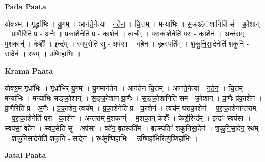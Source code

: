 \documentclass[17pt]{extarticle}
\begin{document}
\textbf{Pada Paata} \newline

योक्त्र᳚म् । गृद्ध्रा॑भिः । यु॒गम् । आन॑ते॒नेत्या - न॒ते॒न॒ । चि॒त्तम् । मन्या॑भिः । स॒क्र्ॐ॒शानिति॑ सं - क्रो॒शान् । प्रा॒णैरिति॑ प्र - अ॒नैः । प्र॒का॒शेनेति॑ प्र - का॒शेन॑ । त्वच᳚म् । प॒रा॒का॒शेनेति॑ परा - का॒शेन॑ । अन्त॑राम् । म॒शकान्॑ । केशैः᳚ । इन्द्र᳚म् । स्वप॒सेति॑ सु - अप॑सा । वहे॑न । बृह॒स्पति᳚म् । श॒कु॒नि॒सा॒देनेति॑ शकुनि - सा॒देन॑ । रथ᳚म् । उ॒ष्णिहा॑भिः ॥  \newline


\textbf{Krama Paata} \newline

योक्त्र॒म् गृध्रा॑भिः । गृध्रा॑भिर् यु॒गम् । यु॒गमान॑तेन । आन॑तेन चि॒त्तम् । आन॑ते॒नेत्या - न॒ते॒न॒ । चि॒त्तम् मन्या॑भिः । मन्या॑भिः सङ्क्रो॒शान् । स॒ङ्क्रो॒शान् प्रा॒णैः । स॒ङ्क्रो॒शानिति॑ सम् - क्रो॒शान् । प्रा॒णैः प्र॑का॒शेन॑ । प्रा॒णैरिति॑ प्र - अ॒नैः । प्र॒का॒शेन॒ त्वच᳚म् । प्र॒का॒शेनेति॑ प्र - का॒शेन॑ । त्वच॑म् पराका॒शेन॑ । प॒रा॒का॒शेनान्त॑राम् । प॒रा॒का॒शेनेति॑ परा -  का॒शेन॑ । अन्त॑राम् म॒शकान्॑ । म॒शका॒न् केशैः᳚ । केशै॒रिन्द्र᳚म् । इन्द्रꣳ॒॒ स्वप॑सा । स्वप॑सा॒ वहे॑न । स्वप॒सेति॑ सु - अप॑सा । वहे॑न॒ बृह॒स्पति᳚म् । बृह॒स्पतिꣳ॑ शकुनिसा॒देन॑ । श॒कु॒नि॒सा॒देन॒ रथ᳚म् । श॒कु॒नि॒सा॒देनेति॑ शकुनि - सा॒देन॑ । रथ॑मु॒ष्णिहा॑भिः । उ॒ष्णिहा॑भि॒रित्यु॒ष्णिहा॑भिः । \newline

\textbf{Jatai Paata} \newline
\end{document}
